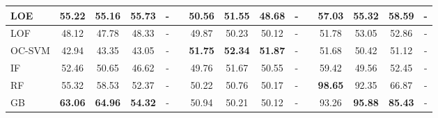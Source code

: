 \documentclass{article}
\begin{document}
\begin{table}[htbp]
{\begin{tabular}{lcccccccccccccc}
LOE & 55.22 & 55.16 & 55.73 & - && 50.56&51.55 & 48.68& - & & \textbf{57.03} & 55.32 & \textbf{58.59}  & - \\ \hline
LOF  & 48.12                               & 47.78                                 &48.33                             & -    & & 49.87                              & 50.23                                  & 50.12                             & -      & & 51.78                             & 53.05                                 &52.86       & -         \\
OC-SVM   & 42.94                                & 43.35                                 & 43.05                              & -  & & \textbf{51.75}                               & \textbf{52.34}                                 & \textbf{51.87}                              & - &  & 51.68                               & 50.42                                 & 51.12    & -               \\
IF   & 52.46                                & 50.65                                  &46.62                              & -  && 49.76                              & 51.67                                  & 50.55                              & -  && 59.42                     & 49.56                                  &52.45 & -   \\
RF & 55.32                             &58.53                                & 52.37                            & -   & & 50.22                             & 50.76                         &50.17                  & -  &  & \textbf{98.65}                        & 92.35                                  &66.87     & -   \\
GB  &\textbf{63.06}                       & \textbf{64.96}                   & \textbf{54.32}                              & -     && 50.94                       &50.21                                &50.12                            & -     & & 93.26                               & \textbf{95.88}                        &\textbf{85.43}        & -     \\
\hline
\end{tabular}}
\end{table}
\end{document}
